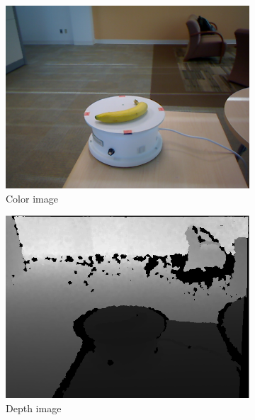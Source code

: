 \documentclass[paper=letter, fontsize=12pt]{article}
\begin{document}
\begin{figure}[htbp]
	\centering
	\begin{subfigure}[b]{0.32\linewidth}
		\includegraphics[width=\textwidth]{banana_1_1_1}
		\caption{Color image}
	\end{subfigure}
	\begin{subfigure}[b]{0.32\linewidth}
		\includegraphics[width=\textwidth]{banana_1_1_1_depth}
		\caption{Depth image}
	\end{subfigure}
	\begin{subfigure}[b]{0.32\linewidth}

\end{subfigure}
\end{figure}
\end{document}
